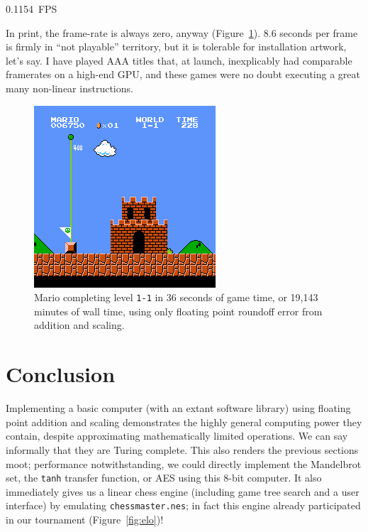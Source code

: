 \documentclass[twocolumn]{article}
\begin{document}
\begin{center}
{\large 0.1154~FPS}
\end{center}

In print, the frame-rate is always zero, anyway
(Figure~\ref{fig:mario}). 8.6 seconds per frame is firmly in ``not
playable'' territory, but it is tolerable for installation artwork,
let's say. I have played AAA titles that, at launch, inexplicably had
comparable framerates on a high-end GPU, and these games were no doubt
executing a great many non-linear instructions.

\begin{figure}[htp]
  \begin{center}
    \includegraphics[width=0.9 \linewidth]{mario-1800}
  \end{center}
  \caption{
    Mario completing level {\tt 1-1} in 36 seconds of game time,
    or 19,143 minutes of wall time, using only floating point roundoff
    error from addition and scaling.
  } \label{fig:mario}
\end{figure}

\section{Conclusion}

Implementing a basic computer (with an extant software library) using
floating point addition and scaling demonstrates the highly general
computing power they contain, despite approximating mathematically
limited operations. We can say informally that they are Turing
complete. This also renders the previous sections moot; performance
notwithstanding, we could directly implement the Mandelbrot set, the
{\tt tanh} transfer function, or AES using this 8-bit computer. It
also immediately gives us a linear chess engine (including game tree
search and a user interface) by emulating {\tt chessmaster.nes}; in
fact this engine already participated in our tournament
(Figure~\ref{fig:elo})!
\end{document}
